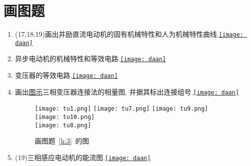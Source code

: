 \documentclass[lang=cn,11pt,marginpar=margintrue]{elegantbook}%
\newcommand{\daan}[1]{\hfill\hyperref[#1]{\texttt{[image: daan]}}}
\begin{document}
\section{画图题}
\begin{enumerate}
	\item (17,18,19)画出并励直流电动机的固有机械特性和人为机械特性曲线.\daan{ht:1}
	\item 异步电动机的机械特性和等效电路.\daan{ht:2}
	\item 变压器的等效电路.\daan{ht:3}
	\item \label{h:3}画出\hyperref[tu:1]{图示}三相变压器连接法的相量图, 并据其标出连接组号.\daan{ht:4}
			\begin{figure}[htbp]
				\centering
				\texttt{[image: tu1.png]}
				\qquad
				\texttt{[image: tu7.png]}
				\qquad
				\texttt{[image: tu9.png]}
				\qquad
				\texttt{[image: tu10.png]}\\
				\texttt{[image: tu8.png]}
				\caption{画图题~\ref{h:3}~的图}\label{tu:1}
				\end{figure}
	\item (19)三相感应电动机的能流图.\daan{ht:5}
\end{enumerate}
\end{document}
